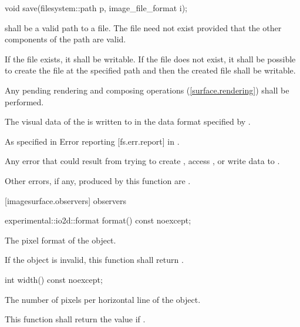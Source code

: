 \begin{itemdecl}
void save(filesystem::path p, image_file_format i);
\end{itemdecl}
\begin{itemdescr}
\pnum
\preconditions
{} shall be a valid path to a file. The file need not exist provided that the other components of the path are valid.

\pnum
If the file exists, it shall be writable. If the file does not exist, it shall be possible to create the file at the specified path and then the created file shall be writable.

\pnum
\effects
Any pending rendering and composing operations (\ref{surface.rendering}) shall be performed.

\pnum
The visual data of the \underlyingimagesurface is written to  in the data format specified by .

\pnum
\throws
As specified in Error reporting [fs.err.report] in \cppseventeen.

\pnum
\errors
Any error that could result from trying to create , access , or write data to .

\pnum
Other errors, if any, produced by this function are .
\end{itemdescr}

 [imagesurface.observers] { observers}

\begin{itemdecl}
experimental::io2d::format format() const noexcept;
\end{itemdecl}
\begin{itemdescr}
\pnum
\returns
The pixel format of the  object.

\pnum
\remarks
If the  object is invalid, this function shall return .
\end{itemdescr}

\begin{itemdecl}
int width() const noexcept;
\end{itemdecl}
\begin{itemdescr}
\pnum
\returns
The number of pixels per horizontal line of the  object.

\pnum
\remarks
This function shall return the value  if .
\end{itemdescr}

